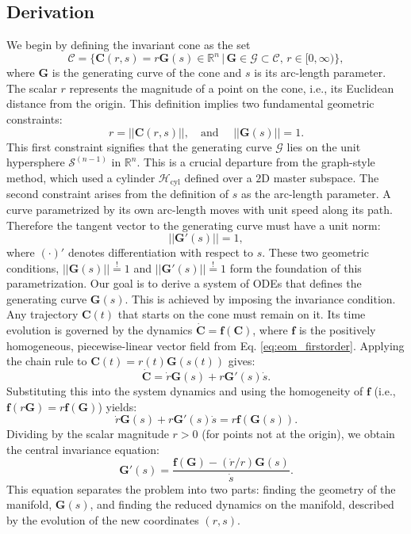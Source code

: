 \documentclass[a4paper,9pt,parskip=half,english]{article}
\theoremstyle{plain}
\theoremstyle{definition}
\newcommand{\mR}{\mathbb{R}}
\newcommand{\vf}{\mathbf f}
\newcommand{\vC}{\mathbf C}
\newcommand{\vG}{\mathbf G}
\begin{document}
\subsection{Derivation}
We begin by defining the invariant cone as the set
\begin{equation}\label{eq:arclength_Ansatz_conedefinition}
	\mathcal{C} = \{  \vC(r,s)= r \vG(s) \in \mR^{n} \, | \, \vG \in \mathcal{G} \subset \mathcal{C}, \, r\in [0, \infty) \},
\end{equation}
where $\vG$ is the generating curve of the cone and $s$ is its arc-length parameter. The scalar $r$ represents the magnitude of a point on the cone, i.e., its Euclidean distance from the origin. This 
definition implies two fundamental geometric constraints: 
\begin{equation}
	r = ||\vC(r,s)||, \quad \mbox{and } \quad ||\vG(s) || = 1 .
\end{equation}
This first constraint signifies that the generating curve $\mathcal{G}$ lies on the unit hypersphere $\mathcal{S}^{(n-1)}$ in $\mR^n$. This is a crucial departure from the graph-style method, which used a cylinder $\mathcal{H}_{\textrm{cyl}}$ defined over a $2$D master subspace. 
The second constraint arises from the definition of $s$ as the arc-length parameter. A curve parametrized by its own arc-length moves with unit speed along its path. Therefore the tangent vector to the generating curve must have a unit norm: 
\begin{equation}
	||\vG'(s)|| = 1,
\end{equation}
where $(\cdot)'$ denotes differentiation with respect to $s$. These two geometric conditions, $||\vG(s)|| \stackrel{!}{=} 1$ and $||\vG'(s)|| \stackrel{!}{=} 1 $ form the foundation of this parametrization. 
Our goal is to derive a system of ODEs that defines the generating curve $\vG(s)$. This is achieved by imposing the invariance condition. Any trajectory $\vC(t)$ that starts on the cone must remain on it. Its time evolution is governed by the dynamics $\dot{\vC} = \vf(\vC)$, where $\vf$ is the positively homogeneous, piecewise-linear vector field from Eq. \eqref{eq:eom_firstorder}. Applying the chain rule to $\vC(t) = r(t)\vG(s(t))$ gives:
\begin{equation}
	\dot{\vC} = \dot{r} \vG(s) + r \vG'(s) \dot{s}.
\end{equation}
Substituting this into the system dynamics and using the homogeneity of $\vf$ (i.e., $\vf(r\vG) = r\vf(\vG)$) yields:
\begin{equation}
	\dot{r} \vG(s) + r \vG'(s) \dot{s} = r \vf(\vG(s)).
\end{equation}
Dividing by the scalar magnitude $r>0$ (for points not at the origin), we obtain the central invariance equation:
\begin{equation}\label{eq:geomODE_arclength}
	\vG'(s) = \frac{\vf(\vG) - (\dot{r}/r) \vG(s)}{\dot{s}}.
\end{equation}
This equation separates the problem into two parts: finding the geometry of the manifold, $\vG(s)$, and finding the reduced dynamics on the manifold, described by the evolution of the new coordinates $(r,s)$.
\end{document}
